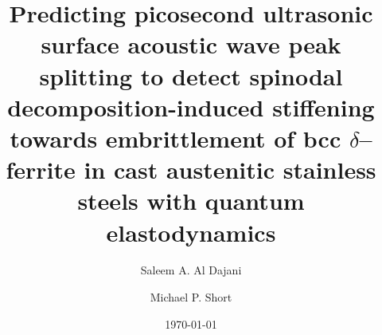 \documentclass[final,3p,times]{elsarticle}
\begin{document}
\begin{frontmatter}


\title
{
\textbf
{
Predicting picosecond ultrasonic surface acoustic wave peak splitting to detect spinodal decomposition-induced stiffening towards embrittlement of bcc $\delta$--ferrite in cast austenitic stainless steels with quantum elastodynamics 
}
}
\date
{\today}
\rhead{\today}



\author[1]{Saleem A. Al Dajani}
\author[1]{Michael P. Short}

\address{
Department of Nuclear Science and Engineering \\
Massachusetts Institute of Technology\\
77 Massachusetts Avenue \\
Cambridge, MA 02139}

\address[1]
{
Corresponding Author: \href{mailto:sdajani@mit.edu}{\texttt{sdajani@mit.edu}}
}
\begin{abstract}


\end{abstract}
\end{frontmatter}
\end{document}
